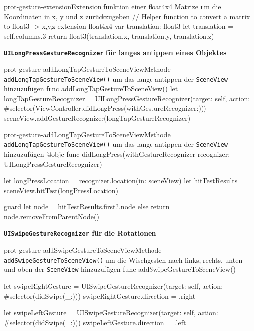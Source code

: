 \begin{description}
    \begin{code}{prot-gesture-extension}{Extension funktion einer float4x4 Matrize um die Koordinaten in x, y und z zurückzugeben}
    // Helper function to convert a matrix to float3 -> x,y,z
    extension float4x4 {
        var translation: float3 {
            let translation = self.columns.3
            return float3(translation.x, translation.y, translation.z)
        }
    }

    \textbf{\texttt{UILongPressGestureRecognizer} für langes antippen eines Objektes}\\

    \begin{code}{prot-gesture-addLongTapGestureToSceneView}{Methode \texttt{addLongTapGestureToSceneView()} um das lange antippen der \texttt{SceneView} hinzuzufügen}
    func addLongTapGestureToSceneView() {
        let longTapGestureRecognizer = UILongPressGestureRecognizer(target: self, action: #selector(ViewController.didLongPress(withGestureRecognizer:)))
        sceneView.addGestureRecognizer(longTapGestureRecognizer)
    }
    \end{code}

    \begin{code}{prot-gesture-addLongTapGestureToSceneView}{Methode \texttt{addLongTapGestureToSceneView()} um das lange antippen der \texttt{SceneView} hinzuzufügen}
    @objc
    func didLongPress(withGestureRecognizer recognizer: UILongPressGestureRecognizer) {
        let longPressLocation = recognizer.location(in: sceneView)
        let hitTestResults = sceneView.hitTest(longPressLocation)
        
        guard let node = hitTestResults.first?.node else { return }
        node.removeFromParentNode()
    }
    \end{code}
    
    \textbf{\texttt{UISwipeGestureRecognizer} für die Rotationen}\\
    
    \begin{code}{prot-gesture-addSwipeGestureToSceneView}{Methode \texttt{addSwipeGestureToSceneView()} um die Wischgesten nach links, rechts, unten und oben der \texttt{SceneView} hinzuzufügen}
    func addSwipeGestureToSceneView() {
        let swipeRightGesture = UISwipeGestureRecognizer(target: self, action: #selector(didSwipe(_:)))
        swipeRightGesture.direction = .right
        
        let swipeLeftGesture = UISwipeGestureRecognizer(target: self, action: #selector(didSwipe(_:)))
        swipeLeftGesture.direction = .left
        
}
\end{code}
\end{code}
\end{description}
